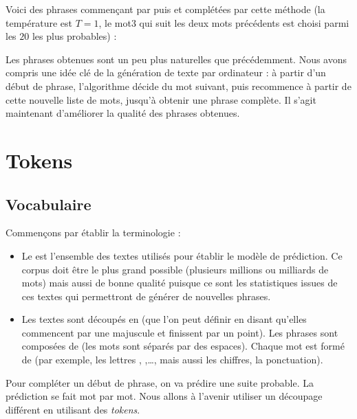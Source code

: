 \documentclass[11pt,class=report,crop=false]{standalone}
\begin{document}
Voici des phrases commençant par  puis  et complétées par cette méthode (la température est $T=1$, le mot3 qui suit les deux mots précédents est choisi parmi les $20$ les plus probables) :

Les phrases obtenues sont un peu plus naturelles que précédemment.
Nous avons compris une idée clé de la génération de texte par ordinateur : à partir d'un début de phrase, l'algorithme décide du mot suivant, puis recommence à partir de cette nouvelle liste de mots, jusqu'à obtenir une phrase complète.
Il s'agit maintenant d'améliorer la qualité des phrases obtenues.


\section{Tokens}

\subsection{Vocabulaire}

Commençons par établir la terminologie :
\begin{itemize}
	\item Le  est l'ensemble des textes utilisés pour établir le modèle de prédiction. Ce corpus doit être le plus grand possible (plusieurs millions ou milliards de mots) mais aussi de bonne qualité puisque ce sont les statistiques issues de ces textes qui permettront de générer de nouvelles phrases.
	
	\item Les textes sont découpés en  (que l'on peut définir en disant qu'elles commencent par une majuscule et finissent par un point).
	Les phrases sont composées de  (les mots sont séparés par des espaces). Chaque mot est formé de  (par exemple, les lettres
	, ,\ldots,  mais aussi les chiffres, la ponctuation).
\end{itemize}


Pour compléter un début de phrase, on va prédire une suite probable.
La prédiction se fait mot par mot. Nous allons à l'avenir utiliser un découpage différent en utilisant des \emph{tokens}.
\end{document}

